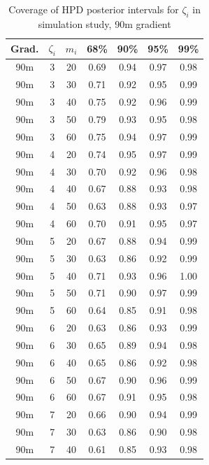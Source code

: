 
\begin{table}
\begin{center}
\caption{Coverage of HPD posterior intervals for $\zeta_i$ in simulation study, 90m gradient
\label{supp:proteomics:tab:sim_coverage_90m}}
\begin{tabular}{ccc|cccc}
 Grad. & $\zeta_i$ & $m_i$ & 68\% & 90\% & 95\% & 99\% \\ 
  \hline
90m &   3 &  20 & 0.69 & 0.94 & 0.97 & 0.98 \\ 
  90m &   3 &  30 & 0.71 & 0.92 & 0.95 & 0.99 \\ 
  90m &   3 &  40 & 0.75 & 0.92 & 0.96 & 0.99 \\ 
  90m &   3 &  50 & 0.79 & 0.93 & 0.95 & 0.98 \\ 
  90m &   3 &  60 & 0.75 & 0.94 & 0.97 & 0.99 \\ 
   \hline
90m &   4 &  20 & 0.74 & 0.95 & 0.97 & 0.99 \\ 
  90m &   4 &  30 & 0.70 & 0.92 & 0.96 & 0.98 \\ 
  90m &   4 &  40 & 0.67 & 0.88 & 0.93 & 0.98 \\ 
  90m &   4 &  50 & 0.63 & 0.88 & 0.93 & 0.97 \\ 
  90m &   4 &  60 & 0.70 & 0.91 & 0.95 & 0.97 \\ 
   \hline
90m &   5 &  20 & 0.67 & 0.88 & 0.94 & 0.99 \\ 
  90m &   5 &  30 & 0.63 & 0.86 & 0.92 & 0.99 \\ 
  90m &   5 &  40 & 0.71 & 0.93 & 0.96 & 1.00 \\ 
  90m &   5 &  50 & 0.71 & 0.90 & 0.97 & 0.99 \\ 
  90m &   5 &  60 & 0.64 & 0.85 & 0.91 & 0.98 \\ 
   \hline
90m &   6 &  20 & 0.63 & 0.86 & 0.93 & 0.99 \\ 
  90m &   6 &  30 & 0.65 & 0.89 & 0.94 & 0.98 \\ 
  90m &   6 &  40 & 0.65 & 0.86 & 0.92 & 0.98 \\ 
  90m &   6 &  50 & 0.67 & 0.90 & 0.96 & 0.99 \\ 
  90m &   6 &  60 & 0.67 & 0.91 & 0.95 & 0.98 \\ 
   \hline
90m &   7 &  20 & 0.66 & 0.90 & 0.94 & 0.99 \\ 
  90m &   7 &  30 & 0.63 & 0.86 & 0.90 & 0.98 \\ 
  90m &   7 &  40 & 0.61 & 0.85 & 0.93 & 0.98 \\ 

\end{tabular}
\end{center}
\end{table}
